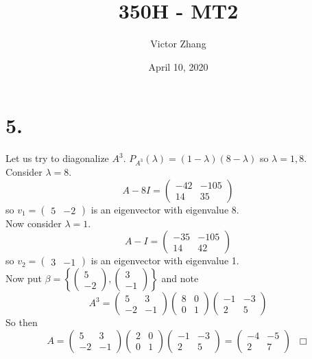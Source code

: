 \documentclass{article}
\title{350H - MT2}
\author{Victor Zhang}
\date{April 10, 2020}
\begin{document}
\maketitle

\section*{5.}
Let us try to diagonalize $A^3$. $P_{A^3}(\lambda) = (1-\lambda)(8-\lambda)$ so $\lambda = 1,8$.\\
Consider $\lambda = 8$.
$$A - 8I = \left( \begin{matrix} -42 & -105 \\ 14 & 35 \end{matrix}\right)$$
so $v_1 = \left( \begin{matrix} 5 & -2 \end{matrix} \right)$ is an eigenvector with eigenvalue 8.\\
Now consider $\lambda = 1$.
$$A - I = \left( \begin{matrix} -35 & -105 \\ 14 & 42 \end{matrix} \right)$$
so $v_2 = \left( \begin{matrix} 3 & -1 \end{matrix} \right)$ is an eigenvector with eigenvalue 1.\\
Now put $\beta = \left\{\left( \begin{matrix} 5 \\ -2 \end{matrix} \right),\left( \begin{matrix} 3 \\ -1 \end{matrix} \right)\right\}$ and note
$$A^3 = \left( \begin{matrix} 5 & 3 \\ -2 & -1 \end{matrix} \right)\left( \begin{matrix} 8 & 0 \\ 0 & 1 \end{matrix} \right)\left( \begin{matrix} -1 & -3 \\ 2 & 5 \end{matrix} \right)$$
So then
$$A = \left( \begin{matrix} 5 & 3 \\ -2 & -1 \end{matrix} \right)\left( \begin{matrix} 2 & 0 \\ 0 & 1 \end{matrix} \right)\left( \begin{matrix} -1 & -3 \\ 2 & 5 \end{matrix} \right) = \left( \begin{matrix} -4 & -5 \\ 2 & 7 \end{matrix} \right) \; \; \Box$$
\end{document}
